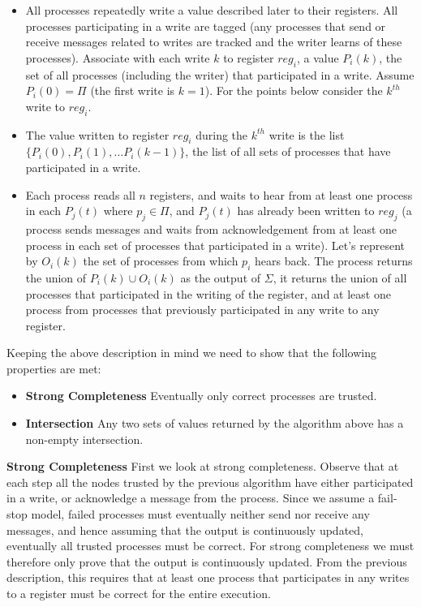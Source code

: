 \begin{itemize}
\item All processes repeatedly write a value described later to their registers. All processes participating
in a write are tagged (\ie any processes that send or receive messages related to writes are tracked and the writer
learns of these processes). Associate with each write $k$ to register $reg_i$, a value $P_i(k)$, the set of all
processes (including the writer) that participated in a write. Assume $P_i(0) = \Pi$ (the first write is $k = 1$). For the points below
consider the $k^{th}$ write to $reg_i$.
\item The value written to register $reg_i$  during the $k^{th}$ write is the list $\{P_i(0), P_i(1), \ldots P_i(k -
1)\}$, \ie the list of all sets of processes that have participated in a write.
\item Each process reads all $n$ registers, and waits to hear from at least one process in each $P_j(t)$ where $p_j \in
\Pi$, and $P_j(t)$ has already been written to $reg_j$ (\ie a process sends messages and waits from acknowledgement from
at least one process in each set of processes that participated in a write). Let's represent by $O_i(k)$ the set of
processes from which $p_i$ hears back. The process returns the union of $P_i(k) \cup O_i(k)$ as the output of $\Sigma$,
\ie it returns the union of all processes that participated in the writing of the register, and at least one process
from processes that previously participated in any write to any register.
\end{itemize}

Keeping the above description in mind we need to show that the following properties are met:
\begin{itemize}
\item \textbf{Strong Completeness} Eventually only correct processes are trusted. 
\item \textbf{Intersection} Any two sets of values returned by the algorithm above has a non-empty intersection.
\end{itemize}

\textbf{Strong Completeness} First we look at strong completeness. Observe that at each step all the nodes trusted by the
previous algorithm have either participated in a write, or acknowledge a message from the process. Since we assume a
fail-stop model, failed processes must eventually neither send nor receive any messages, and hence assuming that the
output is continuously updated, eventually all trusted processes must be correct. For strong completeness we must
therefore only prove that the output is continuously updated. From the previous description, this requires that at least
one process that participates in any writes to a register must be correct for the entire execution.

